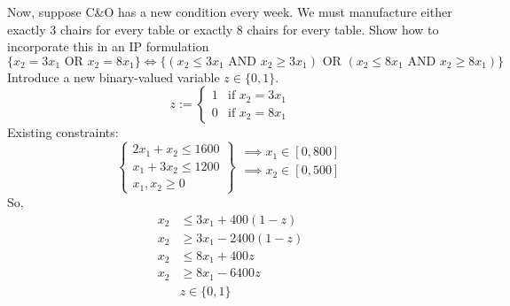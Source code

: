 \begin{exbox}
    \begin{example}
        Now, suppose C\&O has a new condition every week. We must manufacture either
        exactly 3 chairs for every table or exactly 8 chairs for every table. Show
        how to incorporate this in an IP formulation
        \[
            \{x_2=3x_1 \text{ OR } x_2=8x_1\}
            \iff
            \{(x_2\leqslant 3x_1 \text{ AND } x_2\geqslant 3x_1) \text{ OR }
            (x_2\leqslant 8x_1 \text{ AND } x_2\geqslant 8x_1)\}
        \]
        Introduce a new binary-valued variable $z\in\{0,1\}$.
        \[
            z:=
            \begin{cases}
                1 & \text{if } x_2=3x_1 \\
                0 & \text{if } x_2=8x_1
            \end{cases}
        \]
        Existing constraints:
        \[
            \left\{\begin{array}{r}
                2x_1 + x_2 \leqslant 1600 \\
                x_1 + 3x_2 \leqslant 1200 \\
                x_1, x_2 \geqslant  0
            \end{array}\right\}
            \begin{array}{r}
                \implies x_1\in[0,800] \\
                \implies x_2\in[0,500] \\
                \\
            \end{array}
        \]
        So,
        \begin{align*}
            x_2 & \leqslant 3x_1+400(1-z)   \\
            x_2 & \geqslant  3x_1-2400(1-z) \\
            x_2 & \leqslant 8x_1+400z       \\
            x_2 & \geqslant  8x_1-6400z     \\
                & z\in\{0,1\}
        \end{align*}
    \end{example}
\end{exbox}